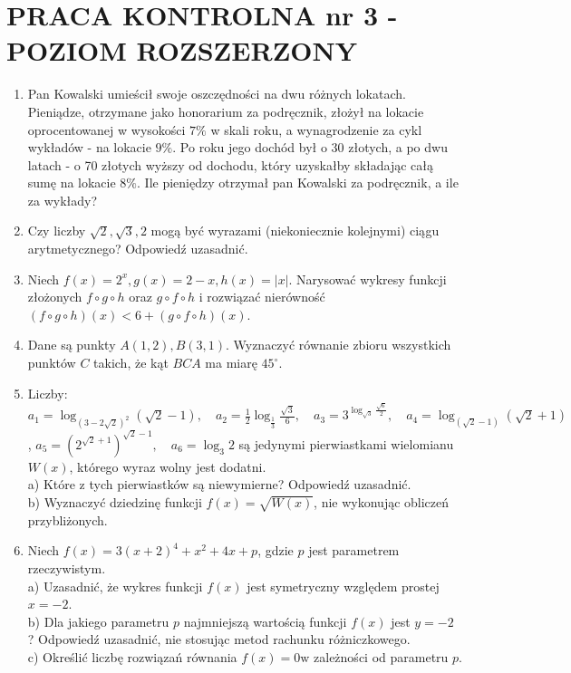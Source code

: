 \documentclass[10pt]{article}
\begin{document}
\section*{PRACA KONTROLNA nr 3 - POZIOM ROZSZERZONY}
\begin{enumerate}
  \item Pan Kowalski umieścił swoje oszczędności na dwu różnych lokatach. Pieniądze, otrzymane jako honorarium za podręcznik, złożył na lokacie oprocentowanej w wysokości $7 \%$ w skali roku, a wynagrodzenie za cykl wykładów - na lokacie $9 \%$. Po roku jego dochód był o 30 złotych, a po dwu latach - o 70 złotych wyższy od dochodu, który uzyskałby składając całą sumę na lokacie $8 \%$. Ile pieniędzy otrzymał pan Kowalski za podręcznik, a ile za wykłady?
  \item Czy liczby $\sqrt{2}, \sqrt{3}, 2$ mogą być wyrazami (niekoniecznie kolejnymi) ciągu arytmetycznego? Odpowiedź uzasadnić.
  \item Niech $f(x)=2^{x}, g(x)=2-x, h(x)=|x|$. Narysować wykresy funkcji złożonych $f \circ g \circ h$ oraz $g \circ f \circ h$ i rozwiązać nierówność $(f \circ g \circ h)(x)<6+(g \circ f \circ h)(x)$.
  \item Dane są punkty $A(1,2), B(3,1)$. Wyznaczyć równanie zbioru wszystkich punktów $C$ takich, że kąt $B C A$ ma miarę $45^{\circ}$.
  \item Liczby: $a_{1}=\log _{(3-2 \sqrt{2})^{2}}(\sqrt{2}-1), \quad a_{2}=\frac{1}{2} \log _{\frac{1}{3}} \frac{\sqrt{3}}{6}, \quad a_{3}=3^{\log _{\sqrt{3}} \frac{\sqrt{6}}{2}}, \quad a_{4}=\log _{(\sqrt{2}-1)}(\sqrt{2}+1)$, $a_{5}=\left(2^{\sqrt{2}+1}\right)^{\sqrt{2}-1}, \quad a_{6}=\log _{3} 2$ są jedynymi pierwiastkami wielomianu $W(x)$, którego wyraz wolny jest dodatni.\\
a) Które z tych pierwiastków są niewymierne? Odpowiedź uzasadnić.\\
b) Wyznaczyć dziedzinę funkcji $f(x)=\sqrt{W(x)}$, nie wykonując obliczeń przybliżonych.
  \item Niech $f(x)=3(x+2)^{4}+x^{2}+4 x+p$, gdzie $p$ jest parametrem rzeczywistym.\\
a) Uzasadnić, że wykres funkcji $f(x)$ jest symetryczny względem prostej $x=-2$.\\
b) Dla jakiego parametru $p$ najmniejszą wartością funkcji $f(x)$ jest $y=-2$ ? Odpowiedź uzasadnić, nie stosując metod rachunku różniczkowego.\\
c) Określić liczbę rozwiązań równania $f(x)=0 \mathrm{w}$ zależności od parametru $p$.
\end{enumerate}
\end{document}
